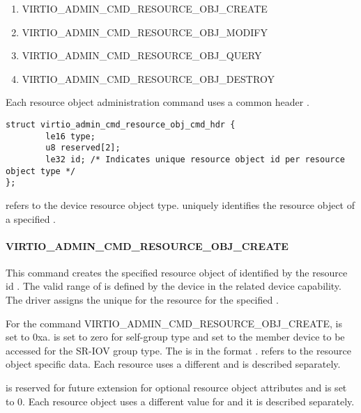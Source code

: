 \begin{enumerate}
\item VIRTIO_ADMIN_CMD_RESOURCE_OBJ_CREATE
\item VIRTIO_ADMIN_CMD_RESOURCE_OBJ_MODIFY
\item VIRTIO_ADMIN_CMD_RESOURCE_OBJ_QUERY
\item VIRTIO_ADMIN_CMD_RESOURCE_OBJ_DESTROY
\end{enumerate}

Each resource object administration command uses a common header
.

\begin{lstlisting}
struct virtio_admin_cmd_resource_obj_cmd_hdr {
        le16 type;
        u8 reserved[2];
        le32 id; /* Indicates unique resource object id per resource object type */
};

\end{lstlisting}

 refers to the device resource object type.
 uniquely identifies the resource object of a specified .

\paragraph{VIRTIO_ADMIN_CMD_RESOURCE_OBJ_CREATE}
\label{par:Basic Facilities of a Virtio Device / Device groups / Group administration commands / Device resource objects / VIRTIO_ADMIN_CMD_RESOURCE_OBJ_CREATE}

This command creates the specified resource object of  identified by the
resource id . The valid range of  is defined by the
device in the related device capability. The driver assigns the unique 
for the resource for the specified .

For the command VIRTIO_ADMIN_CMD_RESOURCE_OBJ_CREATE,  is set to 0xa.
 is set to zero for self-group type and set to
the member device to be accessed for the SR-IOV group type.
The  is in the format
.
 refers to the resource object specific data.
Each resource uses a different  and is described
separately.

 is reserved for future extension for optional resource object attributes and
is set to 0. Each resource object uses a different value for
 and it is described separately.

